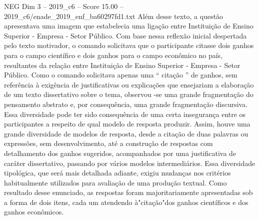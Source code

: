 \begin{textsample}{NEG Dim 3 – 2019\_c6 – Score 15.00 – 2019\_c6/enade\_2019\_enf\_ba60297fd1.txt}
Além desse texto, a questão apresentava uma imagem que estabelecia uma ligação entre Instituição de Ensino Superior - Empresa - Setor Público.
Com base nessa reflexão inicial despertada pelo texto motivador, o comando solicitava que o participante citasse dois ganhos para o campo científico e dois ganhos para o campo econômico no país, resultantes da relação entre Instituição de Ensino Superior - Empresa - Setor Público.
Como o comando solicitava apenas uma “ citação ” de ganhos, sem referência à exigência de justificativas ou explicações que ensejariam a elaboração de um texto dissertativo sobre o tema, observou -se uma grande fragmentação do pensamento abstrato e, por consequência, uma grande fragmentação discursiva.
Essa diversidade pode ter sido consequência de uma certa insegurança entre os participantes a respeito de qual modelo de resposta produzir.
Assim, houve uma grande diversidade de modelos de resposta, desde a citação de duas palavras ou expressões, sem desenvolvimento, até a construção de respostas com detalhamento dos ganhos sugeridos, acompanhados por uma justificativa de caráter dissertativo, passando por vários modelos intermediários.
Essa diversidade tipológica, que será mais detalhada adiante, exigiu mudanças nos critérios habitualmente utilizados para avaliação de uma produção textual.
Como resultado desse enunciado, as respostas foram majoritariamente apresentadas sob a forma de dois itens, cada um atendendo à"citação"dos ganhos científicos e dos ganhos econômicos.

\end{textsample}
